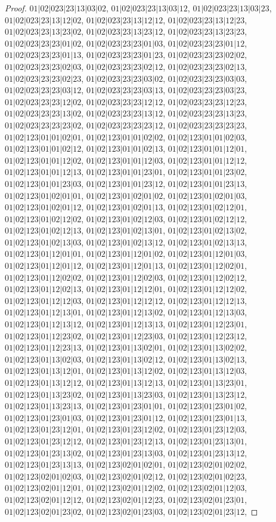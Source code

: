 \documentclass[12pt]{article}
\theoremstyle{plain}
\theoremstyle{definition}
\theoremstyle{remark}
\begin{document}
\begin{proof}
$01|02|023|23|13|03|02$, $01|02|023|23|13|03|12$, $01|02|023|23|13|03|23$, $01|02|023|23|13|12|02$, $01|02|023|23|13|12|12$, $01|02|023|23|13|12|23$, $01|02|023|23|13|23|02$, $01|02|023|23|13|23|12$, $01|02|023|23|13|23|23$, $01|02|023|23|23|01|02$, $01|02|023|23|23|01|03$, $01|02|023|23|23|01|12$, $01|02|023|23|23|01|13$, $01|02|023|23|23|01|23$, $01|02|023|23|23|02|02$, $01|02|023|23|23|02|03$, $01|02|023|23|23|02|12$, $01|02|023|23|23|02|13$, $01|02|023|23|23|02|23$, $01|02|023|23|23|03|02$, $01|02|023|23|23|03|03$, $01|02|023|23|23|03|12$, $01|02|023|23|23|03|13$, $01|02|023|23|23|03|23$, $01|02|023|23|23|12|02$, $01|02|023|23|23|12|12$, $01|02|023|23|23|12|23$, $01|02|023|23|23|13|02$, $01|02|023|23|23|13|12$, $01|02|023|23|23|13|23$, $01|02|023|23|23|23|02$, $01|02|023|23|23|23|12$, $01|02|023|23|23|23|23$, $01|02|123|01|01|02|01$, $01|02|123|01|01|02|02$, $01|02|123|01|01|02|03$, $01|02|123|01|01|02|12$, $01|02|123|01|01|02|13$, $01|02|123|01|01|12|01$, $01|02|123|01|01|12|02$, $01|02|123|01|01|12|03$, $01|02|123|01|01|12|12$, $01|02|123|01|01|12|13$, $01|02|123|01|01|23|01$, $01|02|123|01|01|23|02$, $01|02|123|01|01|23|03$, $01|02|123|01|01|23|12$, $01|02|123|01|01|23|13$, $01|02|123|01|02|01|01$, $01|02|123|01|02|01|02$, $01|02|123|01|02|01|03$, $01|02|123|01|02|01|12$, $01|02|123|01|02|01|13$, $01|02|123|01|02|12|01$, $01|02|123|01|02|12|02$, $01|02|123|01|02|12|03$, $01|02|123|01|02|12|12$, $01|02|123|01|02|12|13$, $01|02|123|01|02|13|01$, $01|02|123|01|02|13|02$, $01|02|123|01|02|13|03$, $01|02|123|01|02|13|12$, $01|02|123|01|02|13|13$, $01|02|123|01|12|01|01$, $01|02|123|01|12|01|02$, $01|02|123|01|12|01|03$, $01|02|123|01|12|01|12$, $01|02|123|01|12|01|13$, $01|02|123|01|12|02|01$, $01|02|123|01|12|02|02$, $01|02|123|01|12|02|03$, $01|02|123|01|12|02|12$, $01|02|123|01|12|02|13$, $01|02|123|01|12|12|01$, $01|02|123|01|12|12|02$, $01|02|123|01|12|12|03$, $01|02|123|01|12|12|12$, $01|02|123|01|12|12|13$, $01|02|123|01|12|13|01$, $01|02|123|01|12|13|02$, $01|02|123|01|12|13|03$, $01|02|123|01|12|13|12$, $01|02|123|01|12|13|13$, $01|02|123|01|12|23|01$, $01|02|123|01|12|23|02$, $01|02|123|01|12|23|03$, $01|02|123|01|12|23|12$, $01|02|123|01|12|23|13$, $01|02|123|01|13|02|01$, $01|02|123|01|13|02|02$, $01|02|123|01|13|02|03$, $01|02|123|01|13|02|12$, $01|02|123|01|13|02|13$, $01|02|123|01|13|12|01$, $01|02|123|01|13|12|02$, $01|02|123|01|13|12|03$, $01|02|123|01|13|12|12$, $01|02|123|01|13|12|13$, $01|02|123|01|13|23|01$, $01|02|123|01|13|23|02$, $01|02|123|01|13|23|03$, $01|02|123|01|13|23|12$, $01|02|123|01|13|23|13$, $01|02|123|01|23|01|01$, $01|02|123|01|23|01|02$, $01|02|123|01|23|01|03$, $01|02|123|01|23|01|12$, $01|02|123|01|23|01|13$, $01|02|123|01|23|12|01$, $01|02|123|01|23|12|02$, $01|02|123|01|23|12|03$, $01|02|123|01|23|12|12$, $01|02|123|01|23|12|13$, $01|02|123|01|23|13|01$, $01|02|123|01|23|13|02$, $01|02|123|01|23|13|03$, $01|02|123|01|23|13|12$, $01|02|123|01|23|13|13$, $01|02|123|02|01|02|01$, $01|02|123|02|01|02|02$, $01|02|123|02|01|02|03$, $01|02|123|02|01|02|12$, $01|02|123|02|01|02|23$, $01|02|123|02|01|12|01$, $01|02|123|02|01|12|02$, $01|02|123|02|01|12|03$, $01|02|123|02|01|12|12$, $01|02|123|02|01|12|23$, $01|02|123|02|01|23|01$, $01|02|123|02|01|23|02$, $01|02|123|02|01|23|03$, $01|02|123|02|01|23|12$, 
\end{proof}
\end{document}
